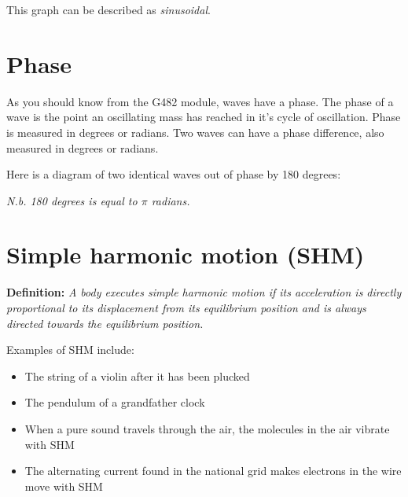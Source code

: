 \documentclass{article}
\begin{document}
This graph can be described as \textit{sinusoidal}.

\section*{Phase}
As you should know from the G482 module, waves have a phase. The phase of a wave is the point an oscillating mass has reached in it's cycle of oscillation. Phase is measured in degrees or radians. Two waves can have a phase difference, also measured in degrees or radians.

Here is a diagram of two identical waves out of phase by 180 degrees:


\textit{N.b. 180 degrees is equal to $\pi$ radians.}

\section*{Simple harmonic motion (SHM)}
\textbf{Definition: }\textit{A body executes simple harmonic motion if its acceleration is directly proportional to its displacement from its equilibrium position and is always directed towards the equilibrium position.}

Examples of SHM include:
\begin{itemize}
	\item The string of a violin after it has been plucked
	\item The pendulum of a grandfather clock
	\item When a pure sound travels through the air, the molecules in the air vibrate with SHM
	\item The alternating current found in the national grid makes electrons in the wire move with SHM
\end{itemize}
\end{document}
